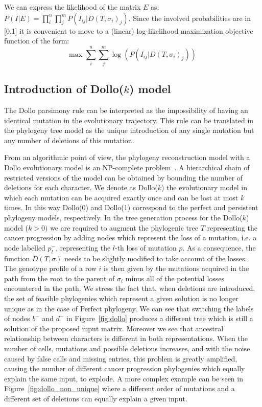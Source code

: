 \documentclass[a4paper,USenglish]{article}
\theoremstyle{definition}
\begin{document}
We can express the likelihood of the matrix $E$ as: $P(I|E) = \prod_{i}^{n} \prod_{j}^{m} P(I_{ij} | D(T, \sigma_i)_j)$.
Since the involved probabilities are in [0,1] it is convenient to move to a (linear) log-likelihood maximization objective function of the form:
\begin{equation}
\label{eq:log-likelihood}
    \mbox{max } \sum_i^n \sum_j^m \log(P( I_{ij}| D(T, \sigma_i)_j))
\end{equation}

\subsection{Introduction of Dollo($k$) model}
\label{sec:intro_dollok}
The Dollo parsimony rule can be interpreted as the impossibility of 
having an identical mutation in the
evolutionary trajectory.
This rule can be translated in the phylogeny tree model as the unique introduction of 
any single mutation but any number of deletions of this mutation. 

From an algorithmic point of view,
the phylogeny reconstruction model 
with a Dollo evolutionary model is 
an NP-complete problem~\cite{BKW95,DAY198633}.
A hierarchical chain of restricted versions of the model can be obtained by bounding the number of deletions for each character.
We denote as Dollo($k$) the evolutionary model in which each mutation can be acquired exactly once and can be lost at most $k$ times. 
In this way Dollo(0) and Dollo(1) correspond to the perfect and persistent phylogeny models, respectively.
In the tree generation process for the Dollo($k$) model ($k>0)$ we are required to augment the phylogenic tree $T$ representing the cancer progression by adding nodes which represent the loss of a mutation, i.e. a node labelled $p^-_l$, representing the $l$-th loss of mutation $p$. 
As a consequence, the function $D(T, \sigma)$ needs to be slightly modified to take account of the losses. The genotype profile of a row $i$ is then given by the mutations acquired in the path from the root to the parent of $\sigma_i$ minus all of the potential losses encountered in the path.
We stress the fact that, when deletions are introduced, 
the set of feasible phylogenies which represent a given solution is no longer unique as in the case of Perfect phylogeny. We can see that switching the labels of nodes $b^-$ and $d^-$ in Figure~\ref{fig:dollo} produces a different tree which is still a solution of the proposed input matrix. 
Moreover we see that ancestral relationship between characters is different in both representations.
When the number of cells, mutations and possible deletions increases, and with the noise caused by false calls and missing entries, this problem is greatly amplified, causing the number of different cancer progression phylogenies which equally explain the same input, to explode. A more complex example can be seen in Figure~\ref{fig:dollo_non_unique} where a different order of mutations and a different set of deletions can equally explain a given input.
\end{document}
